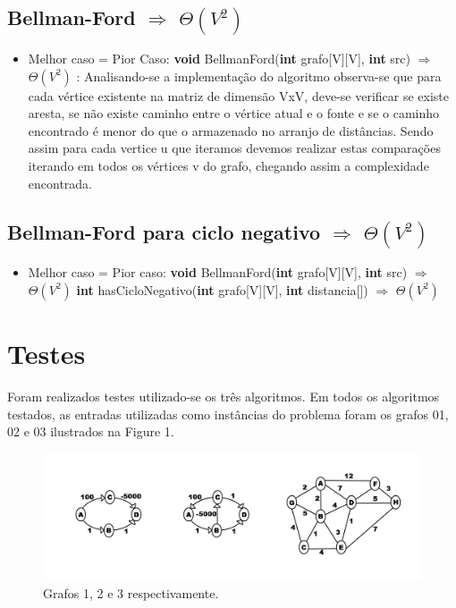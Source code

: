 \documentclass[12pt]{article}
\begin{document}
\subsection{Bellman-Ford  \(\Rightarrow\) \(\Theta(V^{2})\)} 

\begin{itemize}
\item Melhor caso = Pior Caso:
\subitem \textbf{void} BellmanFord(\textbf{int} grafo[V][V], \textbf{int} src) \(\Rightarrow\) \(\Theta(V^{2})\) : Analisando-se a implementação do algoritmo observa-se que para cada vértice existente na matriz de dimensão VxV, deve-se  verificar se existe aresta, se não existe caminho entre o vértice atual e o fonte e se o caminho encontrado é menor do que o armazenado no arranjo de distâncias. Sendo assim para cada vertice  u que iteramos  devemos realizar estas comparações  iterando  em todos os vértices  v do grafo, chegando assim a complexidade encontrada.
			

\end{itemize}

\subsection{Bellman-Ford para ciclo negativo  \(\Rightarrow\) \(\Theta(V^{2})\)}


\begin{itemize}
\item Melhor caso = Pior caso:
\subitem \textbf{void} BellmanFord(\textbf{int} grafo[V][V], \textbf{int} src) \(\Rightarrow\) \(\Theta(V^{2})\)
\subitem  \textbf{int} hasCicloNegativo(\textbf{int} grafo[V][V], \textbf{int} distancia[]) \(\Rightarrow\) \(\Theta(V^{2})\)
\end{itemize}


\section{Testes}


Foram realizados testes utilizado-se  os três algoritmos. Em todos os algoritmos testados,  as entradas utilizadas como instâncias do problema foram os grafos 01, 02 e 03 ilustrados na Figure 1.

\begin{figure}[!htb]
\centering
\includegraphics[scale=0.3]{Grafos.png}
\caption{Grafos 1, 2 e 3 respectivamente.}
\label{Rotulo}
\end{figure}
\end{document}
